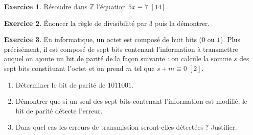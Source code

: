 \documentclass{exam}
\theoremstyle{definition}
\newtheorem{exercice}{Exercice}
\begin{document}
    \begin{exercice}
        Résoudre dans $\mathbb{Z}$ l'équation $5x \equiv 7 \; [14]$.
    \end{exercice}
    
    \begin{exercice}
        Énoncer la règle de divisibilité par $3$ puis la démontrer.
    \end{exercice}
    
    \begin{exercice}
        En informatique, un octet est composé de huit bits ($0$ ou $1$). Plus précisément, il est composé de sept bits contenant l’information à transmettre auquel on ajoute un bit de parité de la façon suivante : on calcule la somme $s$ des sept bits constituant l’octet et on prend $m$ tel que $s + m \equiv 0 \; [2]$.
        \begin{enumerate}
            \item Déterminer le bit de parité de $1011001$.
            \item Démontrer que si un seul des sept bits contenant l’information est modifié, le bit de parité détecte l’erreur.
            \item Dans quel cas les erreurs de transmission seront-elles détectées ? Justifier.
        \end{enumerate}
    \end{exercice}
    
    \vfill
\end{document}
